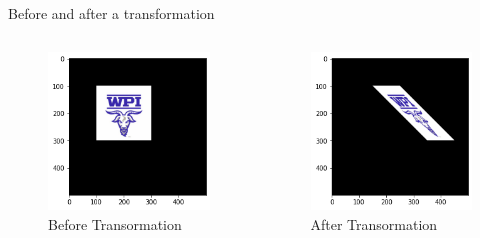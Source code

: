 \documentclass{beamer}
\theoremstyle{definition}
\theoremstyle{theorem}
\begin{document}
 \begin{frame}{Before and after a transformation}
\begin{columns}
    \begin{column}{0.5\textwidth}
        \begin{figure}
  \includegraphics[width= 1\textwidth]{img1.png}
  \caption{Before  Transormation}
  \label{fig:goat1}
\end{figure}    \end{column}
    \begin{column}{0.5\textwidth}
        \begin{figure}
  \includegraphics[width= 1\textwidth]{img2.png}
  \caption{After Transormation}
  \label{fig:goat2}
\end{figure}
    \end{column}
\end{columns}
\end{frame}
\end{document}

